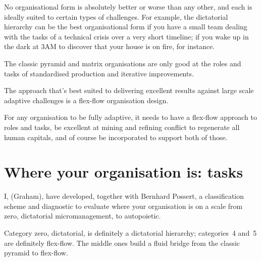 No organisational form is absolutely better or worse than any other, and each is ideally suited to certain types of challenges. For example, the dictatorial hierarchy can be the best organisational form if you have a small team dealing with the tasks of a technical crisis over a very short timeline; if you wake up in the dark at 3AM to discover that your house is on fire, for instance.


The classic pyramid and matrix organisations are only good at the roles and tasks of standardised production and iterative improvements.


The approach that’s best suited to delivering excellent results against large scale adaptive challenges is a flex-flow organisation design. 


For any organisation to be fully adaptive, it needs to have a flex-flow approach to roles and tasks, be excellent at mining and refining conflict to regenerate all human capitals, and of course be incorporated to support both of those. 


\section{Where your organisation is: tasks}
\label{section:where-is-your-organisation-tasks}


I, (Graham), have developed, together with Bernhard Possert, a classification scheme and diagnostic to evaluate where your organisation is on a scale from zero, dictatorial micromanagement, to autopoietic. 


Category zero, dictatorial, is definitely a dictatorial hierarchy; categories~4 and~5 are definitely flex-flow. The middle ones build a fluid bridge from the classic pyramid to flex-flow.


